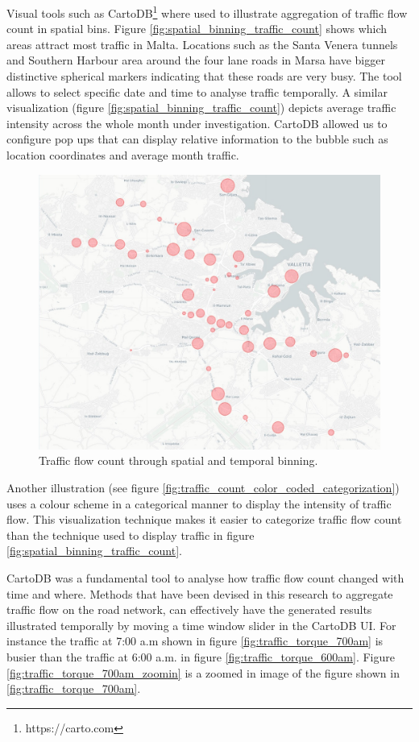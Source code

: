 \documentclass[12pt, a4paper]{report}
\theoremstyle{definition}
\theoremstyle{definition}%
\theoremstyle{definition}%
\theoremstyle{definition}%
\theoremstyle{definition}%
\theoremstyle{definition}%
\begin{document}
Visual tools such as CartoDB\footnote{https://carto.com} where used to illustrate aggregation of traffic flow count in spatial bins. Figure \ref{fig:spatial_binning_traffic_count} shows which areas attract most traffic in Malta. Locations such as the Santa Venera tunnels and Southern Harbour area around the four lane roads in Marsa have bigger distinctive spherical markers indicating that these roads are very busy. The tool allows to select specific date and time to analyse traffic temporally. A similar visualization (figure \ref{fig:spatial_binning_traffic_count}) depicts average traffic intensity across the whole month under investigation. CartoDB allowed us to configure pop ups that can display relative information to the bubble such as location coordinates and average month traffic.

\begin{figure}[!]	
	\includegraphics[scale=0.5]{traffic_month_average.jpg}
	\centering
	\caption{Traffic flow count through spatial and temporal binning. }
	\label{fig:traffic_month_average}
\end{figure}

Another illustration (see figure \ref{fig:traffic_count_color_coded_categorization}) uses a colour scheme in a categorical manner to display the intensity of traffic flow. This visualization technique makes it easier to categorize traffic flow count than the technique used to display traffic in figure \ref{fig:spatial_binning_traffic_count}.

CartoDB was a fundamental tool to analyse how traffic flow count changed with time and where. Methods that have been devised in this research to aggregate traffic flow on the road network, can effectively have the generated results illustrated temporally by moving a time window slider in the CartoDB UI. For instance the traffic at 7:00 a.m shown in figure \ref{fig:traffic_torque_700am} is busier than the traffic at 6:00 a.m. in figure  \ref{fig:traffic_torque_600am}. Figure \ref{fig:traffic_torque_700am_zoomin} is a zoomed in image of the figure shown in  \ref{fig:traffic_torque_700am}.
\end{document}
